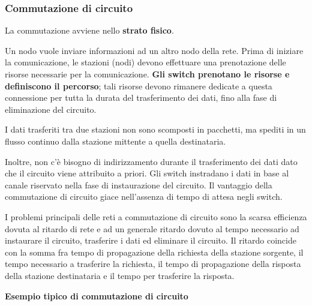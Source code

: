         \subsubsection{Commutazione di circuito}
                    
            La commutazione avviene nello \textbf{strato fisico}.
                
            Un nodo vuole inviare informazioni ad un altro nodo della rete. Prima di iniziare la comunicazione, le stazioni (nodi) devono effettuare una prenotazione delle risorse necessarie per la comunicazione. \textbf{Gli switch prenotano le risorse e definiscono il percorso}; tali risorse devono rimanere dedicate a questa connessione per tutta la durata del trasferimento dei dati, fino alla fase di eliminazione del circuito.
                
            \vspace{3mm}    
            
            I dati trasferiti tra due stazioni non sono scomposti in pacchetti, ma spediti in un flusso continuo dalla stazione mittente a quella destinataria.
                
            Inoltre, non c'è bisogno di indirizzamento durante il trasferimento dei dati dato che il circuito viene attribuito a priori. Gli switch instradano i dati in base al canale riservato nella fase di instaurazione del circuito. Il vantaggio della commutazione di circuito giace nell'assenza di tempo di attesa negli switch.

            \vspace{3mm}
            
            I problemi principali delle reti a commutazione di circuito sono la scarsa efficienza dovuta al ritardo di rete e ad un generale ritardo dovuto al tempo necessario ad instaurare il circuito, trasferire i dati ed eliminare il circuito. Il ritardo coincide con la somma fra tempo di propagazione della richiesta della stazione sorgente, il tempo necessario a trasferire la richiesta, il tempo di propagazione della risposta della stazione destinataria e il tempo per trasferire la risposta.

            \vspace{3mm}

            \textbf{Esempio tipico di commutazione di circuito}
                
